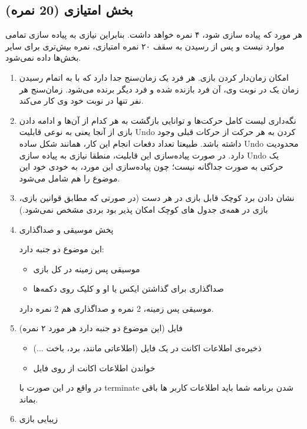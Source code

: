 \documentclass[]{article}
\begin{document}
\begin{itemize}[label = {$\blacksquare$}]
\subsection{بخش امتیازی (20 نمره)}

هر مورد که پیاده سازی شود، ۴ نمره خواهد داشت. بنابراین نیازی به پیاده سازی تمامی موارد نیست و پس از رسیدن به سقف ۲۰ نمره امتیازی، نمره بیش‌تری برای سایر بخش‌ها داده نمی‌شود.

\begin{enumerate}


\item
امکان زمان‌دار کردن بازی. هر فرد یک زمان‌سنج جدا دارد که با به اتمام رسیدن زمان یک در نوبت وی، آن فرد بازنده شده و فرد دیگر برنده می‌شود. زمان‌سنج هر نفر تنها در نوبت خود وی کار می‌کند.


\item
نگه‌داری لیست کامل حرکت‌ها و توانایی بازگشت به هر کدام از آن‌ها و ادامه دادن بازی از آنجا یعنی به نوعی قابلیت Undo کردن به هر حرکت از حرکات قبلی وجود داشته باشد. طبیعتا تعداد دفعات انجام این کار، همانند شکل ساده Undo محدودیت دارد. در صورت پیاده‌سازی این قابلیت، منطقا نیازی به پیاده سازی Undo یک حرکتی به صورت جداگانه نیست؛ چون پیاده‌سازی این مورد، به خودی خود این موضوع را هم شامل می‌شود.

\item
نشان دادن برد کوچک قابل بازی در هر دست (در صورتی که مطابق قوانین بازی، بازی در همه‌ی جدول های کوچک امکان پذیر بود بردی مشخص نمی‌شود.) 

\item
پخش موسیقی و صداگذاری

این موضوع دو جنبه دارد:
\begin{itemize}[label = $\Leftarrow$]

\item
موسیقی پس زمینه در کل بازی


\item
صداگذاری برای گذاشتن ایکس یا او و کلیک روی دکمه‌ها


\end{itemize}

 موسیقی پس زمینه، 2 نمره و صداگذاری هم 2 نمره دارد.
 

\newpage
\item


فایل (این موضوع دو جنبه دارد هر مورد ۲ نمره)
\begin{itemize}[label = $\Leftarrow$]
	
	\item
ذخیره‌ی اطلاعات اکانت در یک فایل (اطلاعاتی مانند، برد، باخت ...)
	
	
	\item
خواندن اطلاعات اکانت از روی فایل
	
	
\end{itemize}
در واقع در این صورت با terminate شدن برنامه شما باید اطلاعات کاربر ها باقی بماند.

\item
زیبایی بازی




\end{enumerate}

\setcounter{secnumdepth}{6}

\end{itemize}
\end{document}
